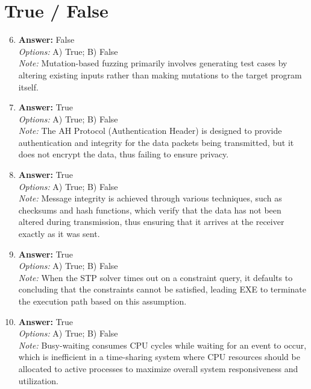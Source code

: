 \documentclass[12pt]{article}
\begin{document}
\section*{True / False}
\begin{enumerate}[label=\arabic*.]
\setcounter{enumi}{5}
\item \textbf{Answer:} False
\\ \textit{Options:} A) True; B) False
\\ \textit{Note:} Mutation-based fuzzing primarily involves generating test cases by altering existing inputs rather than making mutations to the target program itself.
\item \textbf{Answer:} True
\\ \textit{Options:} A) True; B) False
\\ \textit{Note:} The AH Protocol (Authentication Header) is designed to provide authentication and integrity for the data packets being transmitted, but it does not encrypt the data, thus failing to ensure privacy.
\item \textbf{Answer:} True
\\ \textit{Options:} A) True; B) False
\\ \textit{Note:} Message integrity is achieved through various techniques, such as checksums and hash functions, which verify that the data has not been altered during transmission, thus ensuring that it arrives at the receiver exactly as it was sent.
\item \textbf{Answer:} True
\\ \textit{Options:} A) True; B) False
\\ \textit{Note:} When the STP solver times out on a constraint query, it defaults to concluding that the constraints cannot be satisfied, leading EXE to terminate the execution path based on this assumption.
\item \textbf{Answer:} True
\\ \textit{Options:} A) True; B) False
\\ \textit{Note:} Busy-waiting consumes CPU cycles while waiting for an event to occur, which is inefficient in a time-sharing system where CPU resources should be allocated to active processes to maximize overall system responsiveness and utilization.
\end{enumerate}
\end{document}
